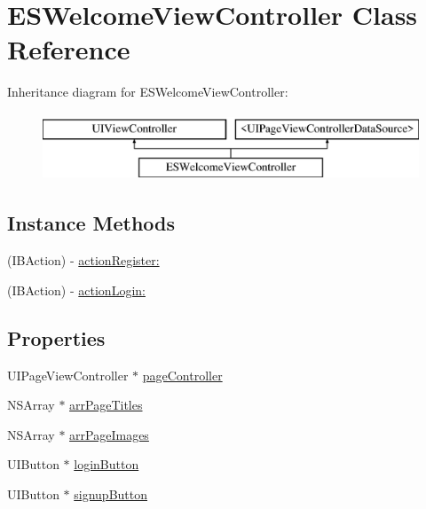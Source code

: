 \hypertarget{interface_e_s_welcome_view_controller}{}\section{E\+S\+Welcome\+View\+Controller Class Reference}
\label{interface_e_s_welcome_view_controller}
Inheritance diagram for E\+S\+Welcome\+View\+Controller\+:\begin{figure}[H]
\begin{center}
\leavevmode
\includegraphics[height=2.000000cm]{interface_e_s_welcome_view_controller}
\end{center}
\end{figure}
\subsection*{Instance Methods}
\begin{DoxyCompactItemize}
\item 
(I\+B\+Action) -\/ \hyperlink{interface_e_s_welcome_view_controller_a44f801b2c2db4582075bd45e594be5e6}{action\+Register\+:}
\item 
(I\+B\+Action) -\/ \hyperlink{interface_e_s_welcome_view_controller_ac34c9fbe1e929dc03d34edba05e72804}{action\+Login\+:}
\end{DoxyCompactItemize}
\subsection*{Properties}
\begin{DoxyCompactItemize}
\item 
U\+I\+Page\+View\+Controller $\ast$ \hyperlink{interface_e_s_welcome_view_controller_ae9b2c8b929156c91622ad2ebd384a05e}{page\+Controller}
\item 
N\+S\+Array $\ast$ \hyperlink{interface_e_s_welcome_view_controller_afc99f304c8e5e4e45b0e38df7530a05f}{arr\+Page\+Titles}
\item 
N\+S\+Array $\ast$ \hyperlink{interface_e_s_welcome_view_controller_ab1fa9eaf196768d10dbaf4e101e9308d}{arr\+Page\+Images}
\item 
U\+I\+Button $\ast$ \hyperlink{interface_e_s_welcome_view_controller_ac798c8dfa635202eee4ce873752c0eac}{login\+Button}
\item 
U\+I\+Button $\ast$ \hyperlink{interface_e_s_welcome_view_controller_a4535c19b54f16ac2bb24553602cebc13}{signup\+Button}
\end{DoxyCompactItemize}


